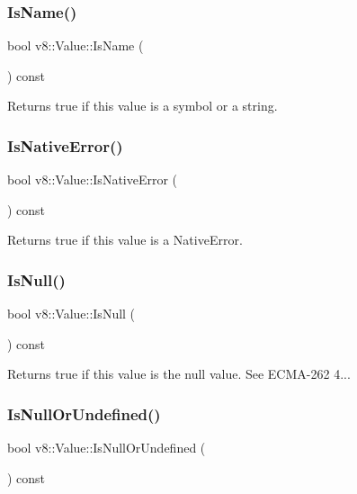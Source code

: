 \subsubsection{\texorpdfstring{Is\+Name()}{IsName()}}
{\footnotesize\ttfamily bool v8\+::\+Value\+::\+Is\+Name (\begin{DoxyParamCaption}{ }\end{DoxyParamCaption}) const}

Returns true if this value is a symbol or a string. \mbox{\label{classv8_1_1Value_a7dc01ab1db65640f774366e8ecab91df}} 
\subsubsection{\texorpdfstring{Is\+Native\+Error()}{IsNativeError()}}
{\footnotesize\ttfamily bool v8\+::\+Value\+::\+Is\+Native\+Error (\begin{DoxyParamCaption}{ }\end{DoxyParamCaption}) const}

Returns true if this value is a Native\+Error. \mbox{\label{classv8_1_1Value_a7710cf2aca870e961f1df65ef6057eb4}} 
\subsubsection{\texorpdfstring{Is\+Null()}{IsNull()}}
{\footnotesize\ttfamily bool v8\+::\+Value\+::\+Is\+Null (\begin{DoxyParamCaption}{ }\end{DoxyParamCaption}) const}

Returns true if this value is the null value. See E\+C\+M\+A-\/262 4... \mbox{\label{classv8_1_1Value_a47bb1e442bf9741e9e29468659e8cdba}} 
\subsubsection{\texorpdfstring{Is\+Null\+Or\+Undefined()}{IsNullOrUndefined()}}
{\footnotesize\ttfamily bool v8\+::\+Value\+::\+Is\+Null\+Or\+Undefined (\begin{DoxyParamCaption}{ }\end{DoxyParamCaption}) const}

